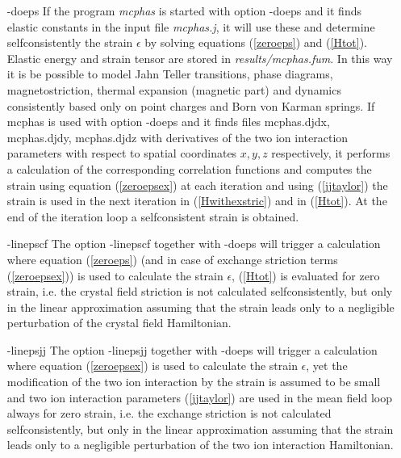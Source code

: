 \begin{itemize}
\item[{\prg -doeps}]
If the program {\em mcphas} is started with option {\prg -doeps}
and it finds elastic constants in the input file {\em mcphas.j}, it
 will use these and determine selfconsistently the strain $\epsilon$ by solving equations
(\ref{zeroeps}) and (\ref{Htot}). Elastic energy and strain tensor are stored in {\em results/mcphas.fum}.
 In this way it is be possible to model Jahn Teller transitions,
phase diagrams, magnetostriction, thermal expansion (magnetic part) and dynamics consistently based
only on point charges and Born von Karman springs. 
If {\prg mcphas} is used with option {\prg -doeps} and it finds files {\prg mcphas.djdx}, {\prg mcphas.djdy}, {\prg mcphas.djdz} with
derivatives of the two ion interaction parameters with respect to
spatial coordinates $x,y,z$ respectively, it performs a calculation of
the corresponding correlation functions and computes the strain  using
equation (\ref{zeroepsex}) at each iteration and 
using  (\ref{jjtaylor}) the strain is used in the next iteration in
 (\ref{Hwithexstric}) and in (\ref{Htot}). At the end of the iteration loop
a selfconsistent strain is obtained.
 
\item[{\prg -linepscf}]
The option {\prg -linepscf} together with {\prg -doeps} will trigger 
a calculation where equation (\ref{zeroeps}) (and in case
of exchange striction terms (\ref{zeroepsex}))
is used to calculate the strain $\epsilon$, (\ref{Htot}) is evaluated
for zero strain, i.e. the crystal field striction is not calculated
selfconsistently, but only in the linear approximation assuming that the 
strain leads only to a negligible perturbation of the crystal field
Hamiltonian.

\item[{\prg -linepsjj}]
The option {\prg -linepsjj} together with {\prg -doeps} will trigger 
a calculation where equation (\ref{zeroepsex})
is used to calculate the strain $\epsilon$, yet the modification of
the two ion interaction by the strain is assumed to be small
and two ion interaction parameters (\ref{jjtaylor}) are used
in the mean field loop always for zero strain, i.e. the exchange striction is not calculated
selfconsistently, but only in the linear approximation assuming that the 
strain leads only to a negligible perturbation of the two ion interaction
Hamiltonian.


\end{itemize}


